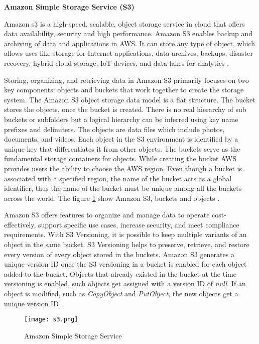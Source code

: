 \textbf{Amazon Simple Storage Service (S3)}

\par Amazon \gls{s3} is a high-speed, scalable, object
storage
service
in cloud that offers data availability, security and high performance.
Amazon S3 enables backup and archiving of data and
applications in AWS. It can store any type of object,
which allows uses like storage for Internet applications, data archives, backups, disaster recovery, hybrid cloud storage, IoT devices, and data lakes for analytics \cite{39}.

\par Storing, organizing, and retrieving data in Amazon S3 primarily focuses on two key components: objects and buckets that work together to create the storage system.
The Amazon S3 object storage data model is a flat structure.
The bucket stores the objects, once the bucket is created.
There is no real hierarchy of sub buckets or subfolders but a logical hierarchy can be inferred using key name prefixes and delimiters.
The objects are data files which include photos,
documents, and videos. Each object in the S3 environment
is identified by a unique key that differentiates it from other objects. The buckets serve as the fundamental storage containers for objects. While creating the bucket AWS provides users the ability to choose the AWS region. Even though a bucket is associated with a specified region, the name of the bucket acts as a global identifier, thus the name of the bucket must be unique among all the buckets across the world. The figure \ref{fig:s3} show Amazon S3, buckets and objects \cite{40}.

\par Amazon S3 offers features to organize and manage data to operate cost-effectively, support specific use cases,
increase security, and meet compliance requirements.
With S3 Versioning, it is possible to keep multiple variants of an object in the same bucket.
S3 Versioning helps to preserve, retrieve, and restore every version of every object stored in the buckets.
Amazon S3 generates a unique version ID once the S3 versioning in a bucket is enabled for each object added to the bucket.
Objects that already existed in the bucket at the time
versioning is enabled, such objects get assigned with a
version ID of \textit{null}. If an object is modified, such as \textit{CopyObject} and \textit{PutObject}, the new objects get a unique version ID \cite{41}.

\begin{figure}
    \centering
    \texttt{[image: s3.png]}
    \caption{Amazon Simple Storage Service}{\cite{42}}
    \label{fig:s3}
\end{figure}

